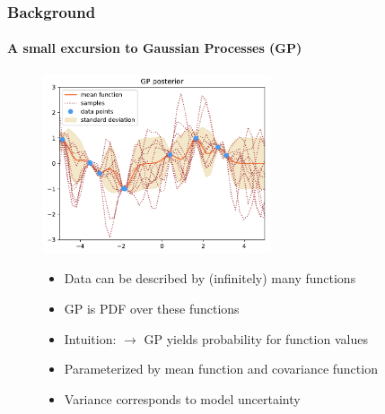 \documentclass[9pt]{beamer}
\begin{document}
\begin{frame}
\frametitle{Background}
\framesubtitle{A small excursion to Gaussian Processes (GP)}
\begin{figure}
	\centering
	\includegraphics[width=0.6\textwidth]{images/post.pdf}
	\begin{itemize}
		\item Data can be described by (infinitely) many functions
		\item GP is PDF over these functions
		\item Intuition: $\rightarrow$ GP yields probability for function values %
		\item Parameterized by mean function and covariance function
		\item Variance corresponds to model uncertainty
	\end{itemize}
\end{figure}
\end{frame}
\end{document}
